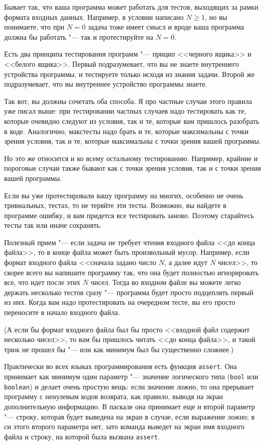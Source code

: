 \documentclass[a4paper,10pt]{problems}
\begin{document}
Бывает так, что ваша программа может работать для тестов, выходящих за рамки формата входных данных.
Например, в условии написано $N\geq 1$, но вы понимаете, что при $N=0$ задача тоже имеет смысл и вроде ваша программа должна бы работать "---
так и протестируйте на $N=0$. 

 Есть два принципа тестирования программ "--- прицип <<черного ящика>> и <<белого ящика>>. 
Первый подразумевает, что вы не знаете внутреннего устройства программы, и тестируете только исходя из знания задачи. 
Второй же подразумевает, что вы внутреннее устройство программы знаете.

Так вот, вы должны сочетать оба способа. 
Я про частные случаи этого правила уже писал выше: при тестировании частных случаев надо тестировать как те, которые очевидно следуют из условия,
так и те, которые вам пришлось разобрать в коде.
Аналогично, макстесты надо брать и те, которые максимальны с точки зрения условия, так и те, которые максимальны с точки зрения вашей программы.

Но это же относится и ко всему остальному тестированию. 
Например, крайние и пороговые случаи также бывают как с точки зрения условия, так и с точки зрения вашей программы.

 Если вы уже протестировали вашу программу на многих, особенно не очень тривиальных, тестах, то не теряйте эти тесты. 
Возможно, вы найдете в программе ошибку, и вам придется все тестировать заново. Поэтому старайтесь тесты так или иначе сохранять.

Полезный прием "--- если задача не требует чтения входного файла <<до конца файла>>, то в конце файла может быть произвольный мусор. 
Например, если формат входного файла <<сначала задано число $N$, а далее идут $N$ чисел>>, то скорее всего вы напишите программу так, 
что она будет полностью игнорировать все, что идет после этих $N$ чисел. 
Тогда во входном файле вы можете легко держать несколько тестов сразу "--- программа будет просто подцеплять первый из них. 
Когда вам надо протестировать на очередном тесте, вы его просто переносите в начало входного файла.

(А если бы формат входного файла был бы просто <<входной файл содержит несколько чисел>>, то вам бы пришлось читать <<до конца файла>>, и такой трюк не прошел бы
"--- или как минимум был бы существенно сложнее.)

Практически во всех языках программирования есть функция \verb`assert`. 
Она принимает как минимум один параметр "--- значение логического типа (\verb`bool` или \verb`boolean`) и делает очень простую вещь:
если значение ложно, то она прерывает программу с ненулевым кодов возврата, как правило, выводя на экран дополнительную информацию.
В паскале она принимает еще и второй параметр "--- строку, которая будет выведена на экран в случае, если выражение ложно; в си этого второго параметра нет,
зато команда выведет на экран имя входного файла и строку, на которой была вызвана \verb`assert`.
\end{document}
